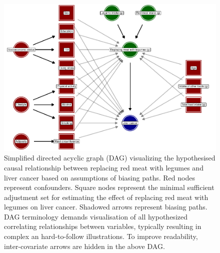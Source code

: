 \appendixstart
\appendix
\section[\appendixname]{}

\begin{figure}[t]

{\centering \includegraphics[width=1\linewidth,]{legliv-nutrients_files/figure-latex/fig2-1}

}

\caption{Simplified directed acyclic graph (DAG) visualizing the hypothesised causal relationship between replacing red meat with legumes and liver cancer based on assumptions of biasing paths. Red nodes represent confounders. Square nodes represent the minimal sufficient adjustment set for estimating the effect of replacing red meat with legumes on liver cancer. Shadowed arrows represent biasing paths. DAG terminology demands visualisation of all hypothesized correlating relationships between variables, typically resulting in complex an hard-to-follow illustrations. To improve readability, inter-covariate arrows are hidden in the above DAG.}\label{fig:fig2}
\end{figure}

